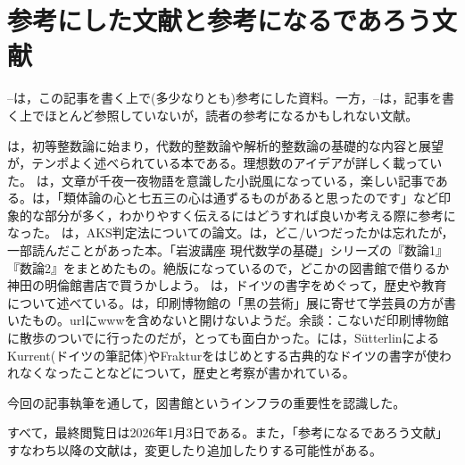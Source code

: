 \section{参考にした文献と参考になるであろう文献}\label{bib}
\cite{yukie}--\cite{tsuji}は，この記事を書く上で(多少なりとも)参考にした資料。一方，\cite{suron}--\cite{frak3}は，記事を書く上でほとんど参照していないが，読者の参考になるかもしれない文献。

\cite{modern_integers}は，初等整数論に始まり，代数的整数論や解析的整数論の基礎的な内容と展望が，テンポよく述べられている本である。理想数のアイデアが詳しく載っていた。
\cite{susemi}は，文章が千夜一夜物語を意識した小説風になっている，楽しい記事である。\cite{intro}は，「類体論の心と七五三の心は通ずるものがあると思ったのです」など印象的な部分が多く，わかりやすく伝えるにはどうすれば良いか考える際に参考になった。
\cite{primes_p}は，AKS判定法についての論文。\cite{suron}は，どこ/いつだったかは忘れたが，一部読んだことがあった本。「岩波講座 現代数学の基礎」シリーズの『数論1』『数論2』をまとめたもの。絶版になっているので，どこかの図書館で借りるか神田の明倫館書店で買うかしよう。
\cite{frak1}は，ドイツの書字をめぐって，歴史や教育について述べている。\cite{frak2}は，印刷博物館の「黒の芸術」展に寄せて学芸員の方が書いたもの。urlにwwwを含めないと開けないようだ。余談：こないだ印刷博物館に散歩のついでに行ったのだが，とっても面白かった。\cite{frak3}には，SütterlinによるKurrent(ドイツの筆記体)やFrakturをはじめとする古典的なドイツの書字が使われなくなったことなどについて，歴史と考察が書かれている。

今回の記事執筆を通して，図書館というインフラの重要性を認識した。

すべて，最終閲覧日は2026年1月3日である。また，「参考になるであろう文献」すなわち\cite{suron}以降の文献は，変更したり追加したりする可能性がある。

